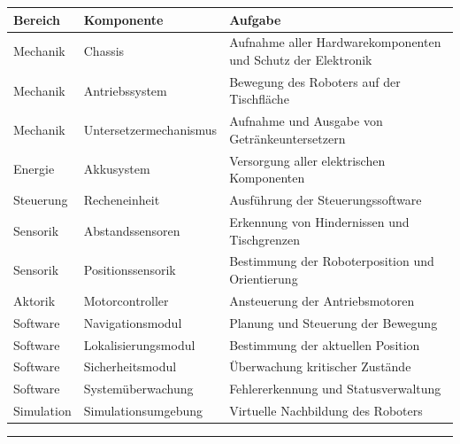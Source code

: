 \documentclass[
  a4paper,
  12pt,
  DIV=12,        %
  parskip=half,  %
  headings=small %
]{scrartcl}
\theoremstyle{definition}
\theoremstyle{definition}
\begin{document}
\begin{longtable}[]{@{}
  >{\raggedright\arraybackslash}p{}
  >{\raggedright\arraybackslash}p{}
  >{\raggedright\arraybackslash}p{}@{}}
\toprule\noalign{}
\begin{minipage}[b]{\linewidth}\raggedright
Bereich
\end{minipage} & \begin{minipage}[b]{\linewidth}\raggedright
Komponente
\end{minipage} & \begin{minipage}[b]{\linewidth}\raggedright
Aufgabe
\end{minipage} \\
\midrule\noalign{}
\endhead
\bottomrule\noalign{}
\endlastfoot
Mechanik & Chassis & Aufnahme aller Hardwarekomponenten und Schutz der
Elektronik \\
Mechanik & Antriebssystem & Bewegung des Roboters auf der Tischfläche \\
Mechanik & Untersetzermechanismus & Aufnahme und Ausgabe von
Getränkeuntersetzern \\
Energie & Akkusystem & Versorgung aller elektrischen Komponenten \\
Steuerung & Recheneinheit & Ausführung der Steuerungssoftware \\
Sensorik & Abstandssensoren & Erkennung von Hindernissen und
Tischgrenzen \\
Sensorik & Positionssensorik & Bestimmung der Roboterposition und
Orientierung \\
Aktorik & Motorcontroller & Ansteuerung der Antriebsmotoren \\
Software & Navigationsmodul & Planung und Steuerung der Bewegung \\
Software & Lokalisierungsmodul & Bestimmung der aktuellen Position \\
Software & Sicherheitsmodul & Überwachung kritischer Zustände \\
Software & Systemüberwachung & Fehlererkennung und Statusverwaltung \\
Simulation & Simulationsumgebung & Virtuelle Nachbildung des Roboters \\
\end{longtable}

\begin{center}\rule{0.5\linewidth}{0.5pt}\end{center}
\end{document}
